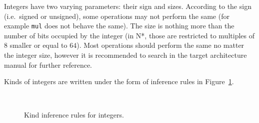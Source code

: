 Integers have two varying parameters: their sign and sizes.
According to the sign (i.e.\ signed or unsigned), some operations may not perform the same (for example \texttt{mul} does not behave the same).
The size is nothing more than the number of bits occupied by the integer (in N*, those are restricted to multiples of $8$ smaller or equal to $64$).
Most operations should perform the same no matter the integer size, however it is recommended to search in the target architecture manual for further reference.

Kinds of integers are written under the form of inference rules in Figure~\ref{fig:nstar-common-ts-integer-kindrules}.

\begin{figure}[htb]
  \centering

  \begin{prooftree}
  \end{prooftree}
  \hspace{3em}
  \begin{prooftree}
  \end{prooftree}
  \hspace{3em}
  \begin{prooftree}
  \end{prooftree}
  \hspace{3em}
  \begin{prooftree}
  \end{prooftree}
  \\\vspace{\baselineskip}
  \begin{prooftree}
  \end{prooftree}
  \hspace{3em}
  \begin{prooftree}
  \end{prooftree}
  \hspace{3em}
  \begin{prooftree}
  \end{prooftree}
  \hspace{3em}
  \begin{prooftree}
  \end{prooftree}

  \caption{Kind inference rules for integers.}
  \label{fig:nstar-common-ts-integer-kindrules}
\end{figure}

